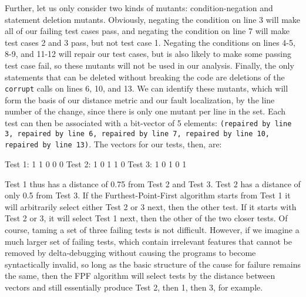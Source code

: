 Further, let us only consider two kinds of mutants:  condition-negation and statement deletion mutants.  Obviously, negating the condition on line 3 will make all of our failing test cases pass, and negating the condition on line 7 will make test cases 2 and 3 pass, but not test case 1.  Negating the conditions on lines 4-5, 8-9, and 11-12 will repair our test cases, but is also likely to make some passing test case fail, so these mutants will not be used in our analysis.  Finally, the only statements that can be deleted without breaking the code are deletions of the {\tt corrupt} calls on lines 6, 10, and 13.  We can identify these mutants, which will form the basis of our distance metric and our fault localization, by the line number of the change, since there is only one mutant per line in the set.  Each test can then be associated with a bit-vector of 5 elements:  {\tt (repaired by line 3, repaired by line 6, repaired by line 7, repaired by line 10, repaired by line 13)}.  The vectors for our tests, then, are:

\begin{code}
Test 1: 1 1 0 0 0
Test 2: 1 0 1 1 0
Test 3: 1 0 1 0 1
\end{code}

Test 1 thus has a distance of 0.75 from Test 2 and Test 3.  Test 2 has a distance of only 0.5 from Test 3.  If the Furthest-Point-First algorithm starts from Test 1 it will arbitrarily select either Test 2 or 3 next, then the other test.  If it starts with Test 2 or 3, it will select Test 1 next, then the other of the two closer tests.  Of course, taming a set of three failing tests is not difficult.  However, if we imagine a much larger set of failing tests, which contain irrelevant features that cannot be removed by delta-debugging without causing the programs to become syntactically invalid, so long as the basic structure of the cause for failure remains the same, then the FPF algorithm will select tests by the distance between vectors and still essentially produce Test 2, then 1, then 3, for example.